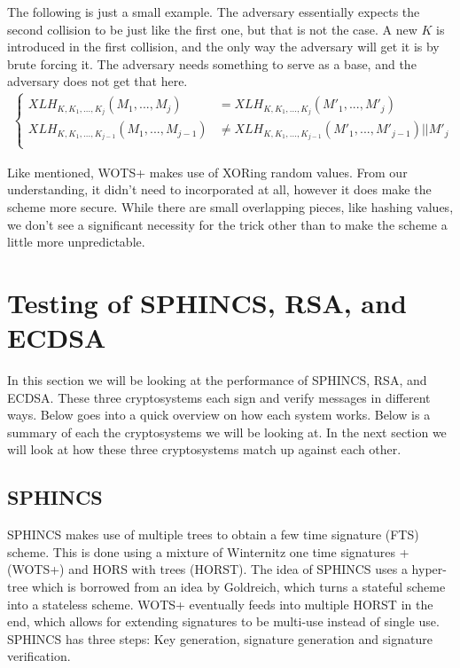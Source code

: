 \documentclass[]{scrartcl}
\begin{document}
The following is just a small example. The adversary essentially expects the second collision to be just like the first one, but that is not the case. A new $K$ is introduced in the first collision, and the only way the adversary will get it is by brute forcing it. The adversary needs something to serve as a base, and the adversary does not get that here.
\begin{equation}
\begin{split}
\begin{cases}
XLH_{K,K_1,...,K_j}(M_1,...,M_j) & =  XLH_{K,K_1,...,K_j}(M'_1,...,M'_j)\\
XLH_{K,K_1,...,K_{j-1}}(M_1,...,M_{j-1}) & \neq XLH_{K,K_1,...,K_{j-1}}(M'_1,...,M'_{j-1}) || M'_j\\
\end{cases}
\end{split}
\end{equation}

Like mentioned, WOTS+ makes use of XORing random values. From our understanding, it didn't need to incorporated at all, however it does make the scheme more secure. While there are small overlapping pieces, like hashing values, we don't see a significant necessity for the trick other than to make the scheme a little more unpredictable.

\section*{Testing of SPHINCS, RSA, and ECDSA}
In this section we will be looking at the performance of SPHINCS, RSA, and ECDSA. These three cryptosystems each sign and verify messages in different ways. Below goes into a quick overview on how each system works. Below is a summary of each the cryptosystems we will be looking at. In the next section we will look at how these three cryptosystems match up against each other.

\subsection*{SPHINCS}
SPHINCS makes use of multiple trees to obtain a few time signature (FTS) scheme. This is done using a mixture of Winternitz one time signatures + (WOTS+) and HORS with trees (HORST). The idea of SPHINCS uses a hyper-tree which is borrowed from an idea by Goldreich, which turns a stateful scheme into a stateless scheme. WOTS+ eventually feeds into multiple HORST in the end, which allows for extending signatures to be multi-use instead of single use. SPHINCS has three steps: Key generation, signature generation and signature verification.
\end{document}
